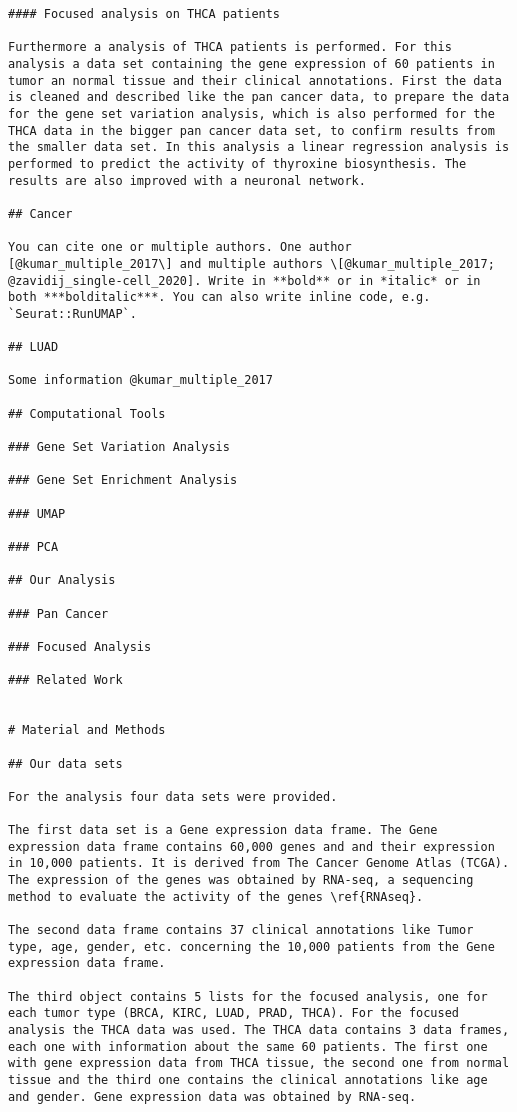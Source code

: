 \documentclass[
  parskip,
  oneside]{scrreprt}
\begin{document}
\begin{verbatim}
#### Focused analysis on THCA patients

Furthermore a analysis of THCA patients is performed. For this analysis a data set containing the gene expression of 60 patients in tumor an normal tissue and their clinical annotations. First the data is cleaned and described like the pan cancer data, to prepare the data for the gene set variation analysis, which is also performed for the THCA data in the bigger pan cancer data set, to confirm results from the smaller data set. In this analysis a linear regression analysis is performed to predict the activity of thyroxine biosynthesis. The results are also improved with a neuronal network.

## Cancer

You can cite one or multiple authors. One author [@kumar_multiple_2017\] and multiple authors \[@kumar_multiple_2017; @zavidij_single-cell_2020]. Write in **bold** or in *italic* or in both ***bolditalic***. You can also write inline code, e.g. `Seurat::RunUMAP`.

## LUAD

Some information @kumar_multiple_2017

## Computational Tools

### Gene Set Variation Analysis

### Gene Set Enrichment Analysis

### UMAP

### PCA

## Our Analysis

### Pan Cancer

### Focused Analysis

### Related Work


# Material and Methods

## Our data sets

For the analysis four data sets were provided.

The first data set is a Gene expression data frame. The Gene expression data frame contains 60,000 genes and and their expression in 10,000 patients. It is derived from The Cancer Genome Atlas (TCGA). The expression of the genes was obtained by RNA-seq, a sequencing method to evaluate the activity of the genes \ref{RNAseq}.

The second data frame contains 37 clinical annotations like Tumor type, age, gender, etc. concerning the 10,000 patients from the Gene expression data frame.

The third object contains 5 lists for the focused analysis, one for each tumor type (BRCA, KIRC, LUAD, PRAD, THCA). For the focused analysis the THCA data was used. The THCA data contains 3 data frames, each one with information about the same 60 patients. The first one with gene expression data from THCA tissue, the second one from normal tissue and the third one contains the clinical annotations like age and gender. Gene expression data was obtained by RNA-seq.


\end{verbatim}
\end{document}
